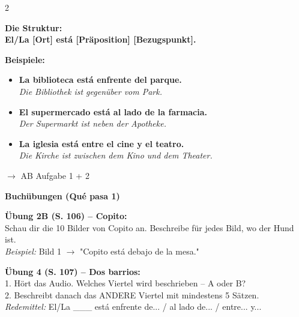 \documentclass[11pt, a4paper]{article}
\newcommand{\seriftext}[1]{{\fontfamily{ppl}\selectfont #1}}
\newcommand{\es}[1]{\seriftext{\textbf{#1}}}
\newcommand{\de}[1]{\textit{\textcolor{akzent}{#1}}}
\newcommand{\abmark}[1]{{\footnotesize\textcolor{akzent}{$\rightarrow$ AB #1}}}
\begin{document}
\begin{multicols}{2}
\vspace{4pt}

\begin{grammatikbox}
\textbf{Die Struktur:}\\[2pt]
\es{El/La [Ort] está [Präposition] [Bezugspunkt].}
\end{grammatikbox}

\vspace{4pt}

\textbf{Beispiele:}

\begin{itemize}[leftmargin=1.2em, itemsep=2pt]
    \item \es{La biblioteca está enfrente del parque.}\\
          \de{Die Bibliothek ist gegenüber vom Park.}
    \item \es{El supermercado está al lado de la farmacia.}\\
          \de{Der Supermarkt ist neben der Apotheke.}
    \item \es{La iglesia está entre el cine y el teatro.}\\
          \de{Die Kirche ist zwischen dem Kino und dem Theater.}
\end{itemize}

\vspace{4pt}

\abmark{Aufgabe 1 + 2}

\end{multicols}

\vspace{4pt}


\begin{grammatikbox}
\textbf{Buchübungen (Qué pasa 1)}

\vspace{4pt}

\textbf{Übung 2B (S. 106) -- Copito:}\\
Schau dir die 10 Bilder von Copito an. Beschreibe für jedes Bild, wo der Hund ist.\\
\textit{Beispiel:} Bild 1 $\rightarrow$ "Copito está debajo de la mesa."

\vspace{6pt}

\textbf{Übung 4 (S. 107) -- Dos barrios:}\\
1. Hört das Audio. Welches Viertel wird beschrieben -- A oder B?\\
2. Beschreibt danach das ANDERE Viertel mit mindestens 5 Sätzen.\\
\textit{Redemittel:} El/La \_\_\_ está enfrente de... / al lado de... / entre... y...
\end{grammatikbox}
\end{document}
